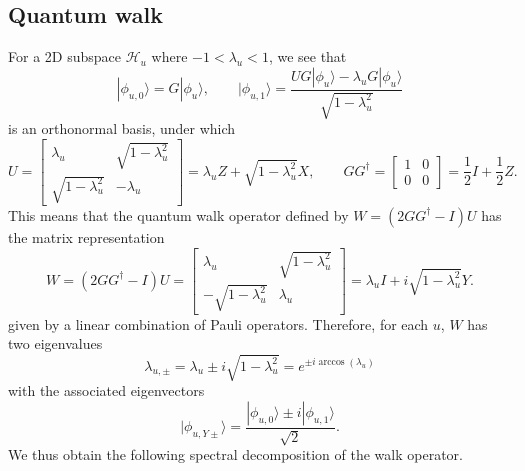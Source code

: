\documentclass[letterpaper,onecolumn,11pt,accepted=2026-02-14]{quantumarticle}
\theoremstyle{remark}
\theoremstyle{plain}
\newcommand{\ket}[1]{|#1\rangle}
\begin{document}
\subsection{Quantum walk}
\label{append:qubitization_walk}
For a 2D subspace $\mathcal{H}_u$ where $-1<\lambda_u<1$, we see that 
\begin{equation*}
    \ket{\phi_{u,0}}=G\ket{\phi_u},\qquad
    \ket{\phi_{u,1}}=\frac{UG\ket{\phi_u}-\lambda_uG\ket{\phi_u}}{\sqrt{1-\lambda_u^2}}
\end{equation*}
is an orthonormal basis, under which
    \begin{equation}
        U=\begin{bmatrix}
            \lambda_u & \sqrt{1-\lambda_u^2}\\
            \sqrt{1-\lambda_u^2} & -\lambda_u
        \end{bmatrix}
        =\lambda_uZ+\sqrt{1-\lambda_u^2}X,\qquad
        GG^\dagger=
        \begin{bmatrix}
            1 & 0\\
            0 & 0
        \end{bmatrix}
        =\frac{1}{2}I+\frac{1}{2}Z.
    \end{equation}
This means that the quantum walk operator defined by $W=\left(2GG^\dagger-I\right)U$ has the matrix representation
\begin{equation}
    W=\left(2GG^\dagger-I\right)U=
    \begin{bmatrix}
        \lambda_u & \sqrt{1-\lambda_u^2}\\
        -\sqrt{1-\lambda_u^2} & \lambda_u
    \end{bmatrix}
    =\lambda_uI+i\sqrt{1-\lambda_u^2}Y.
\end{equation}
given by a linear combination of Pauli operators.
Therefore, for each $u$, $W$ has two eigenvalues
\begin{equation}
    \lambda_{u,\pm}=\lambda_u\pm i\sqrt{1-\lambda_u^2}
    =e^{\pm i\arccos(\lambda_u)}
\end{equation}
with the associated eigenvectors
\begin{equation}
    \ket{\phi_{u,Y\pm}}=\frac{\ket{\phi_{u,0}}\pm i\ket{\phi_{u,1}}}{\sqrt{2}}.
\end{equation}
We thus obtain the following spectral decomposition of the walk operator.
\end{document}
